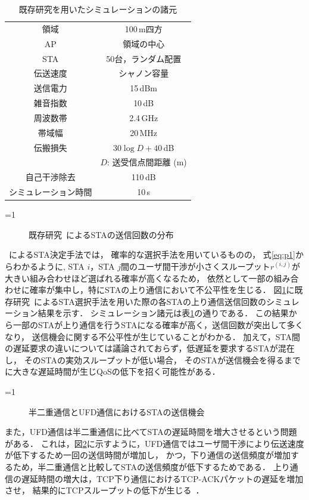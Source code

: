 \documentclass[master]{kuisthesis}		%
\newcommand{\sij}{(i,j)}
\newcommand{\rij}{r^{\sij}}
\newcounter{flagFig}
\begin{document}
			\par
			\begin{table}[htbp]
				\centering
				\caption{既存研究\cite{promac}を用いたシミュレーションの諸元}
				\label{tab:test}
				\begin{tabular}{cc} \hline
					領域 & 100\,m四方 \\
					AP & 領域の中心 \\
					STA & 50台，ランダム配置 \\
					伝送速度 & シャノン容量 \\
					送信電力 & 15\,dBm \\
					雑音指数 & 10\,dB \\
					周波数帯 & 2.4\,GHz \\
					帯域幅 & 20\,MHz \\
					伝搬損失 & $30\log D + 40$\,dB\\
					&$D$: 送受信点間距離 (m)\\
					自己干渉除去 & 110\,dB \\
					シミュレーション時間 & 10\,s \\\hline
				\end{tabular}
			\end{table}
			\ifnum\value{flagFig}=1 {\begin{figure}[htbp]
				\centering
				\caption{既存研究~\cite{promac}によるSTAの送信回数の分布}
				\label{fig:numtx}
			\end{figure}}\fi
			~\cite{promac}によるSTA決定手法では，
			確率的な選択手法を用いているものの，
			式\eqref{eq:p1}からわかるように,
			STA $i$，STA $j$間のユーザ間干渉が小さくスループット$\rij$が大きい組み合わせほど選ばれる確率が高くなるため，
			依然として一部の組み合わせに確率が集中し，特にSTAの上り通信において不公平性を生じる．
			図\ref{fig:numtx}に既存研究~\cite{promac}によるSTA選択手法を用いた際の各STAの上り通信送信回数のシミュレーション結果を示す．
			シミュレーション諸元は表\ref{tab:test}の通りである．
			この結果から一部のSTAが上り通信を行うSTAになる確率が高く，送信回数が突出して多くなり，
			送信機会に関する不公平性が生じていることがわかる．
			加えて，STA間の遅延要求の違いについては議論されておらず，低遅延を要求するSTAが混在し，
			そのSTAの実効スループットが低い場合，
			そのSTAが送信機会を得るまでに大きな遅延時間が生じQoSの低下を招く可能性がある．
			\par
			\ifnum\value{flagFig}=1 {\begin{figure}[htbp]
				\centering
				\caption{半二重通信とUFD通信におけるSTAの送信機会}
				\label{fig:problem}
			\end{figure}}\fi
			また，UFD通信は半二重通信に比べてSTAの遅延時間を増大させるという問題がある．
			これは，図\ref{fig:problem}に示すように，UFD通信ではユーザ間干渉により伝送速度が低下するため一回の送信時間が増加し，
			かつ，下り通信の送信頻度が増加するため，半二重通信と比較してSTAの送信頻度が低下するためである．
			上り通信の遅延時間の増大は，TCP下り通信におけるTCP-ACKパケットの遅延を増加させ，
			結果的にTCPスループットの低下が生じる~\cite{rtt}．
\end{document}
